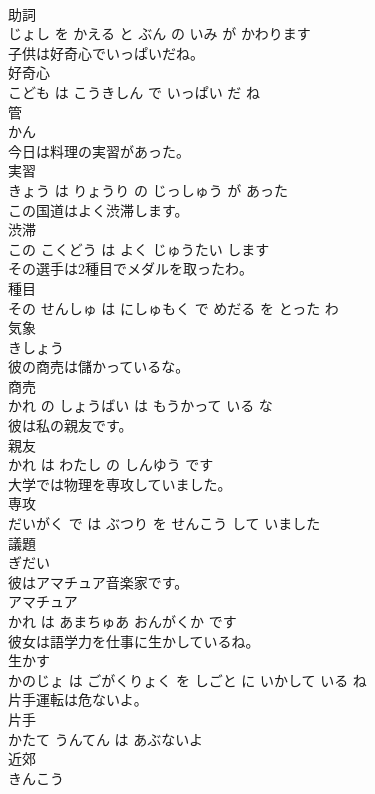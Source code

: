\documentclass[8pt]{extreport}
\begin{document}
\begin{CJK}{UTF8}{min}
\\	助詞 
\\	じょし を かえる と ぶん の いみ が かわります			
\\	子供は好奇心でいっぱいだね。	
\\	好奇心 
\\	こども は こうきしん で いっぱい だ ね			
\\	管	
\\	かん		
\\	今日は料理の実習があった。	
\\	実習 
\\	きょう は りょうり の じっしゅう が あった			
\\	この国道はよく渋滞します。	
\\	渋滞 
\\	この こくどう は よく じゅうたい します			
\\	その選手は2種目でメダルを取ったわ。	
\\	種目 
\\	その せんしゅ は にしゅもく で めだる を とった わ			
\\	気象	
\\	きしょう		
\\	彼の商売は儲かっているな。	
\\	商売 
\\	かれ の しょうばい は もうかって いる な			
\\	彼は私の親友です。	
\\	親友 
\\	かれ は わたし の しんゆう です			
\\	大学では物理を専攻していました。	
\\	専攻 
\\	だいがく で は ぶつり を せんこう して いました			
\\	議題	
\\	ぎだい		
\\	彼はアマチュア音楽家です。	
\\	アマチュア 
\\	かれ は あまちゅあ おんがくか です			
\\	彼女は語学力を仕事に生かしているね。	
\\	生かす 
\\	かのじょ は ごがくりょく を しごと に いかして いる ね			
\\	片手運転は危ないよ。	
\\	片手 
\\	かたて うんてん は あぶないよ			
\\	近郊	
\\	きんこう		

\end{CJK}
\end{document}
